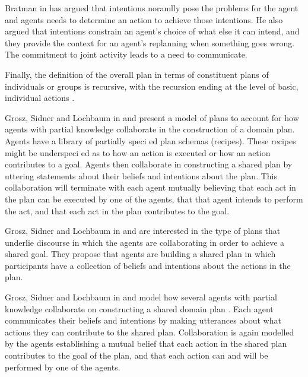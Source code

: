 \documentclass[11pt]{article}
\begin{document}
Bratman in \cite{bratman:intentions-plans} has argued that intentions noramlly
pose the problems for the agent and agents needs to determine an action to
achieve those intentions. He also argued that intentions constrain an agent’s
choice of what else it can intend, and they provide the context for an agent’s
replanning when something goes wrong. The commitment to joint activity leads to
a need to communicate.

Finally, the definition of the overall plan in terms of constituent plans of
individuals or groups is recursive, with the recursion ending at the level of
basic, individual actions \cite{grosz:mice-menus}.

Grosz, Sidner and Lochbaum in \cite{grosz:plans-discourse} and
\cite{lochbaum:plan-models} present a model of plans to account for how agents
with partial knowledge collaborate in the construction of a domain plan. Agents
have a library of partially speci ed plan schemas (recipes). These recipes might
be underspeci ed as to how an action is executed or how an action contributes to
a goal. Agents then collaborate in constructing a shared plan by uttering
statements about their beliefs and intentions about the plan. This collaboration
will terminate with each agent mutually believing that each act in the plan can
be executed by one of the agents, that that agent intends to perform the act,
and that each act in the plan contributes to the goal.

Grosz, Sidner and Lochbaum in \cite{grosz:plans-discourse} and
\cite{lochbaum:plan-models} are interested in the type of plans that underlie
discourse in which the agents are collaborating in order to achieve a shared
goal. They propose that agents are building a shared plan in which participants
have a collection of beliefs and intentions about the actions in the plan.

Grosz, Sidner and Lochbaum in \cite{grosz:plans-discourse} and
\cite{lochbaum:plan-models} model how several agents with partial knowledge
collaborate on constructing a shared domain plan . Each agent communicates their
beliefs and intentions by making utterances about what actions they can
contribute to the shared plan. Collaboration is again modelled by the agents
establishing a mutual belief that each action in the shared plan contributes to
the goal of the plan, and that each action can and will be performed by one of
the agents.
\end{document}

